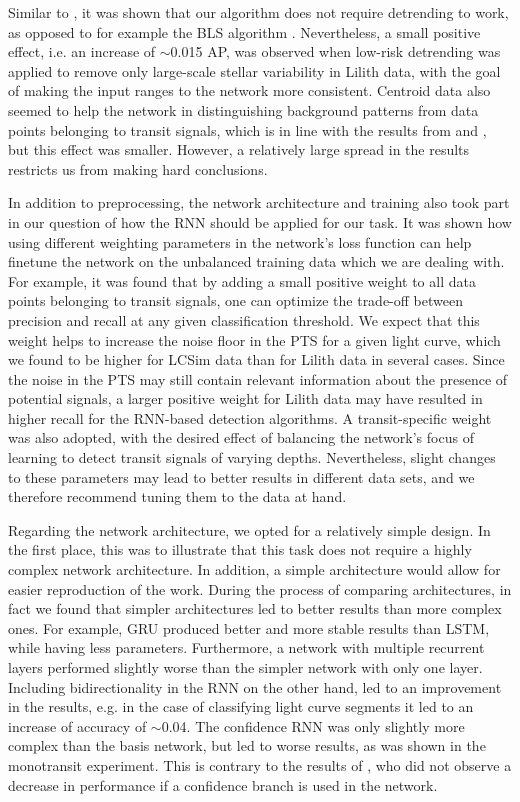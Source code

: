Similar to \cite{pearson2018searching}, it was shown that our algorithm does not require detrending to work, as opposed to for example the BLS algorithm \cite{kovacs2002box}. Nevertheless, a small positive effect, i.e. an increase of $\sim$0.015 AP, was observed when low-risk detrending was applied to remove only large-scale stellar variability in Lilith data, with the goal of making the input ranges to the network more consistent. Centroid data also seemed to help the network in distinguishing background patterns from data points belonging to transit signals, which is in line with the results from \cite{osborn2020rapid} and \cite{morvan2020detrending}, but this effect was smaller. However, a relatively large spread in the results restricts us from making hard conclusions.

In addition to preprocessing, the network architecture and training also took part in our question of how the RNN should be applied for our task. It was shown how using different weighting parameters in the network's loss function can help finetune the network on the unbalanced training data which we are dealing with. For example, it was found that by adding a small positive weight to all data points belonging to transit signals, one can optimize the trade-off between precision and recall at any given classification threshold. We expect that this weight helps to increase the noise floor in the PTS for a given light curve, which we found to be higher for LCSim data than for Lilith data in several cases. Since the noise in the PTS may still contain relevant information about the presence of potential signals, a larger positive weight for Lilith data may have resulted in higher recall for the RNN-based detection algorithms. A transit-specific weight was also adopted, with the desired effect of balancing the network's focus of learning to detect transit signals of varying depths. Nevertheless, slight changes to these parameters may lead to better results in different data sets, and we therefore recommend tuning them to the data at hand.

Regarding the network architecture, we opted for a relatively simple design. In the first place, this was to illustrate that this task does not require a highly complex network architecture. In addition, a simple architecture would allow for easier reproduction of the work. During the process of comparing architectures, in fact we found that simpler architectures led to better results than more complex ones. For example, GRU produced better and more stable results than LSTM, while having less parameters. Furthermore, a network with multiple recurrent layers performed slightly worse than the simpler network with only one layer. Including bidirectionality in the RNN on the other hand, led to an improvement in the results, e.g. in the case of classifying light curve segments it led to an increase of accuracy of $\sim$0.04. The confidence RNN was only slightly more complex than the basis network, but led to worse results, as was shown in the monotransit experiment. This is contrary to the results of \cite{devries2018learning}, who did not observe a decrease in performance if a confidence branch is used in the network.

